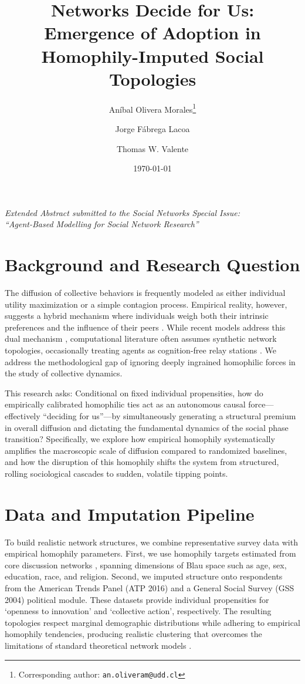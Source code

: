\documentclass[12pt, a4paper]{article}
\title{Networks Decide for Us: \\ Emergence of Adoption in Homophily-Imputed Social Topologies}
\author[1]{Aníbal Olivera Morales\thanks{Corresponding author: \texttt{an.oliveram@udd.cl}}}
\author[1]{Jorge Fábrega Lacoa}
\author[2]{Thomas W. Valente}
\affil[1]{Centro de Investigación en Complejidad Social, Universidad del Desarrollo, Santiago, Chile}
\affil[2]{Department of Population and Public Health Sciences, Keck School of Medicine, University of Southern California, Los Angeles, USA}
\date{\today}
\begin{document}
\maketitle

\begin{center}
    \textit{Extended Abstract submitted to the Social Networks Special Issue: \\ ``Agent-Based Modelling for Social Network Research''}
\end{center}

\vspace{0.5cm}

\section*{Background and Research Question}
The diffusion of collective behaviors is frequently modeled as either individual utility maximization or a simple contagion process. Empirical reality, however, suggests a hybrid mechanism where individuals weigh both their intrinsic preferences and the influence of their peers \cite{granovetter1978, valente1996}. While recent models address this dual mechanism \cite{tur2024}, computational literature often assumes synthetic network topologies, occasionally treating agents as cognition-free relay stations \cite{goldberg2021}. We address the methodological gap of ignoring deeply ingrained homophilic forces in the study of collective dynamics.

This research asks: Conditional on fixed individual propensities, how do empirically calibrated homophilic ties act as an autonomous causal force---effectively ``deciding for us''---by simultaneously generating a structural premium in overall diffusion and dictating the fundamental dynamics of the social phase transition? Specifically, we explore how empirical homophily systematically amplifies the macroscopic scale of diffusion compared to randomized baselines, and how the disruption of this homophily shifts the system from structured, rolling sociological cascades to sudden, volatile tipping points.

\section*{Data and Imputation Pipeline}
To build realistic network structures, we combine representative survey data with empirical homophily parameters. First, we use homophily targets estimated from core discussion networks \cite{smith2014}, spanning dimensions of Blau space such as age, sex, education, race, and religion. Second, we imputed structure onto respondents from the American Trends Panel (ATP 2016) and a General Social Survey (GSS 2004) political module. These datasets provide individual propensities for `openness to innovation' and `collective action', respectively. The resulting topologies respect marginal demographic distributions while adhering to empirical homophily tendencies, producing realistic clustering that overcomes the limitations of standard theoretical network models \cite{snijders2010, mcpherson2019}.
\end{document}
